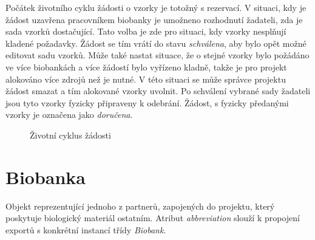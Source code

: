 Počátek životního cyklu žádosti o vzorky je totožný s rezervací. V situaci, kdy je žádost uzavřena pracovníkem biobanky je umožneno rozhodnutí žadateli, zda je sada vzorků dostačující. Tato volba je zde pro situaci, kdy vzorky nesplňují kladené požadavky. Žádost se tím vrátí do stavu \textit{schválena}, aby bylo opět možné editovat sadu vzorků.
Může také nastat situace, že o stejné vzorky bylo požádáno ve více biobankách a více žádostí bylo vyřízeno kladně, takže je pro projekt alokováno více zdrojů než je nutné. V této situaci se může správce projektu žádost smazat a tím alokované vzorky uvolnit.
Po schválení vybrané sady žadateli jsou tyto vzorky fyzicky připraveny k odebrání. Žádost, s fyzicky předanými vzorky je označena jako \textit{doručena}.

\begin{figure}[hbtp]
\begin{center}
\caption{Životní cyklus žádosti}
\label{fig:implementace:zadost:cyklus}
\end{center}
\end{figure}


\section{Biobanka}
Objekt reprezentující jednoho z partnerů, zapojených do projektu, který poskytuje biologický materiál ostatním. Atribut \textit{abbreviation} slouží k propojení exportů s konkrétní instancí třídy \textit{Biobank}.

